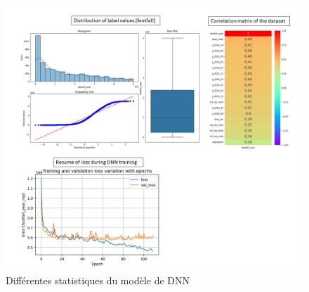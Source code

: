 \documentclass{themeensg}
\begin{document}
\begin{appendices}
\label{stat_dnn}

\begin{figure}[H]
  \centering
  \includegraphics[width=\linewidth]{images/graphs/stats_footfall.png}
  \caption{Différentes statistiques du modèle de DNN}
\end{figure}

\end{appendices} 
\end{document}
